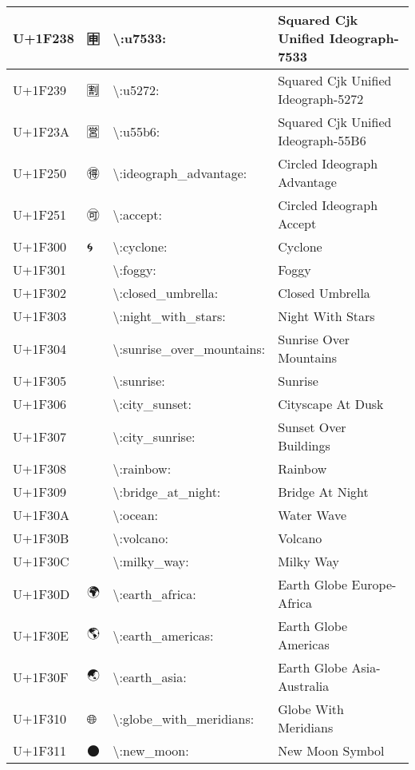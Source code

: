 \begin{table}[h]
\begin{tabulary}{\linewidth}{|L|L|L|L|}
U+1F238 & 🈸 & {\textbackslash}:u7533: & Squared Cjk Unified Ideograph-7533 \\
\hline
U+1F239 & 🈹 & {\textbackslash}:u5272: & Squared Cjk Unified Ideograph-5272 \\
\hline
U+1F23A & 🈺 & {\textbackslash}:u55b6: & Squared Cjk Unified Ideograph-55B6 \\
\hline
U+1F250 & 🉐 & {\textbackslash}:ideograph\_advantage: & Circled Ideograph Advantage \\
\hline
U+1F251 & 🉑 & {\textbackslash}:accept: & Circled Ideograph Accept \\
\hline
U+1F300 & 🌀 & {\textbackslash}:cyclone: & Cyclone \\
\hline
U+1F301 & 🌁 & {\textbackslash}:foggy: & Foggy \\
\hline
U+1F302 & 🌂 & {\textbackslash}:closed\_umbrella: & Closed Umbrella \\
\hline
U+1F303 & 🌃 & {\textbackslash}:night\_with\_stars: & Night With Stars \\
\hline
U+1F304 & 🌄 & {\textbackslash}:sunrise\_over\_mountains: & Sunrise Over Mountains \\
\hline
U+1F305 & 🌅 & {\textbackslash}:sunrise: & Sunrise \\
\hline
U+1F306 & 🌆 & {\textbackslash}:city\_sunset: & Cityscape At Dusk \\
\hline
U+1F307 & 🌇 & {\textbackslash}:city\_sunrise: & Sunset Over Buildings \\
\hline
U+1F308 & 🌈 & {\textbackslash}:rainbow: & Rainbow \\
\hline
U+1F309 & 🌉 & {\textbackslash}:bridge\_at\_night: & Bridge At Night \\
\hline
U+1F30A & 🌊 & {\textbackslash}:ocean: & Water Wave \\
\hline
U+1F30B & 🌋 & {\textbackslash}:volcano: & Volcano \\
\hline
U+1F30C & 🌌 & {\textbackslash}:milky\_way: & Milky Way \\
\hline
U+1F30D & 🌍 & {\textbackslash}:earth\_africa: & Earth Globe Europe-Africa \\
\hline
U+1F30E & 🌎 & {\textbackslash}:earth\_americas: & Earth Globe Americas \\
\hline
U+1F30F & 🌏 & {\textbackslash}:earth\_asia: & Earth Globe Asia-Australia \\
\hline
U+1F310 & 🌐 & {\textbackslash}:globe\_with\_meridians: & Globe With Meridians \\
\hline
U+1F311 & 🌑 & {\textbackslash}:new\_moon: & New Moon Symbol \\

\end{tabulary}
\end{table}

